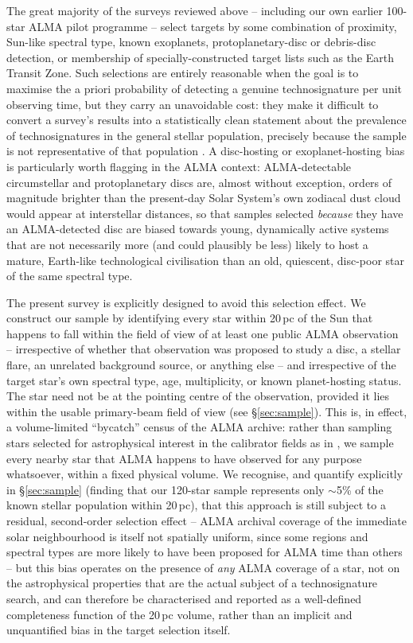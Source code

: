 \documentclass{openjournal}
\begin{document}
The great majority of the surveys reviewed above -- including our own earlier
100-star ALMA pilot programme -- select targets by some combination of proximity,
Sun-like spectral type, known exoplanets, protoplanetary-disc or debris-disc
detection, or membership of specially-constructed target lists such as the Earth
Transit Zone. Such selections are entirely reasonable when the goal is to
maximise the a priori probability of detecting a genuine technosignature per
unit observing time, but they carry an unavoidable cost: they make it difficult
to convert a survey's results into a statistically clean statement about the
prevalence of technosignatures in the general stellar population, precisely
because the sample is not representative of that population
\citep{Margot2023}. A disc-hosting or exoplanet-hosting bias is particularly
worth flagging in the ALMA context: ALMA-detectable circumstellar and
protoplanetary discs are, almost without exception, orders of magnitude brighter
than the present-day Solar System's own zodiacal dust cloud would appear at
interstellar distances, so that samples selected \emph{because} they have an
ALMA-detected disc are biased towards young, dynamically active systems that are
not necessarily more (and could plausibly be less) likely to host a mature,
Earth-like technological civilisation than an old, quiescent, disc-poor star of
the same spectral type.

The present survey is explicitly designed to avoid this selection effect. We
construct our sample by identifying every star within 20\,pc of the Sun that
happens to fall within the field of view of at least one public ALMA
observation -- irrespective of whether that observation was proposed to study a
disc, a stellar flare, an unrelated background source, or anything else -- and
irrespective of the target star's own spectral type, age, multiplicity, or known
planet-hosting status. The star need not be at the pointing centre of the
observation, provided it lies within the usable primary-beam field of view (see
\S\ref{sec:sample}). This is, in effect, a volume-limited ``bycatch'' census of
the ALMA archive: rather than sampling stars selected for astrophysical interest
in the calibrator fields as in \citet{Mason2024}, we sample every nearby star
that ALMA happens to have observed for any purpose whatsoever, within a fixed
physical volume. We recognise, and quantify explicitly in \S\ref{sec:sample}
(finding that our 120-star sample represents only $\sim$5\% of the known
stellar population within 20\,pc), that this approach is still subject to
a residual, second-order selection effect -- ALMA archival coverage of the
immediate solar neighbourhood is itself not spatially uniform, since some
regions and spectral types are more likely to have been proposed for ALMA
time than others -- but this bias operates on the presence of \emph{any}
ALMA coverage of a star, not on the astrophysical properties that are the
actual subject of a technosignature search, and can therefore be
characterised and reported as a well-defined completeness function of the
20\,pc volume, rather than an implicit and unquantified bias in the target
selection itself.
\end{document}
